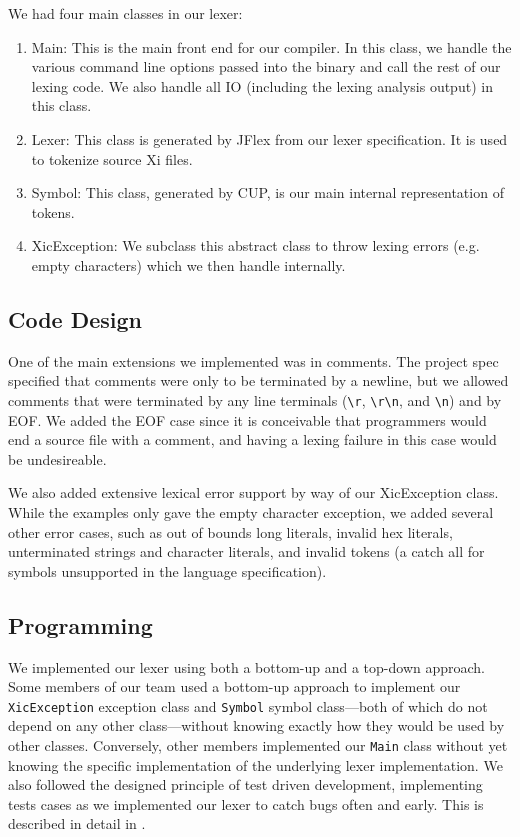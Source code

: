 \documentclass{hw}
\begin{document}
We had four main classes in our lexer:
\begin{enumerate}
  \item{Main:} This is the main front end for our compiler. In this class, we
  handle the various command line options passed into the binary and call the
  rest of our lexing code. We also handle all IO (including the lexing analysis
  output) in this class.

  \item{Lexer:} This class is generated by JFlex from our lexer specification.
  It is used to tokenize source Xi files.

  \item{Symbol:} This class, generated by CUP, is our main internal representation
  of tokens.

  \item{XicException:} We subclass this abstract class to throw lexing errors (e.g.
  empty characters) which we then handle internally.
\end{enumerate}
\subsection{Code Design}
One of the main extensions we implemented was in comments. The project spec specified that
comments were only to be terminated by a newline, but we allowed comments that were
terminated by any line terminals (\verb$\r$, \verb$\r\n$, and \verb$\n$) and by EOF.
We added the EOF case since it is conceivable that programmers would end a source file
with a comment, and having a lexing failure in this case would be undesireable. 


We also added extensive lexical error support by way of our XicException class. While
the examples only gave the empty character exception, we added several other error cases,
such as out of bounds long literals, invalid hex literals, unterminated strings and
character literals, and invalid tokens (a catch all for symbols unsupported in the
language specification).

\subsection{Programming}
We implemented our lexer using both a bottom-up and a top-down approach. Some
members of our team used a bottom-up approach to implement our
\texttt{XicException} exception class and \texttt{Symbol} symbol class---both
of which do not depend on any other class---without knowing exactly how they
would be used by other classes. Conversely, other members implemented our
\texttt{Main} class without yet knowing the specific implementation of the
underlying lexer implementation. We also followed the designed principle of
test driven development, implementing tests cases as we implemented our lexer
to catch bugs often and early. This is described in detail in .
\end{document}
